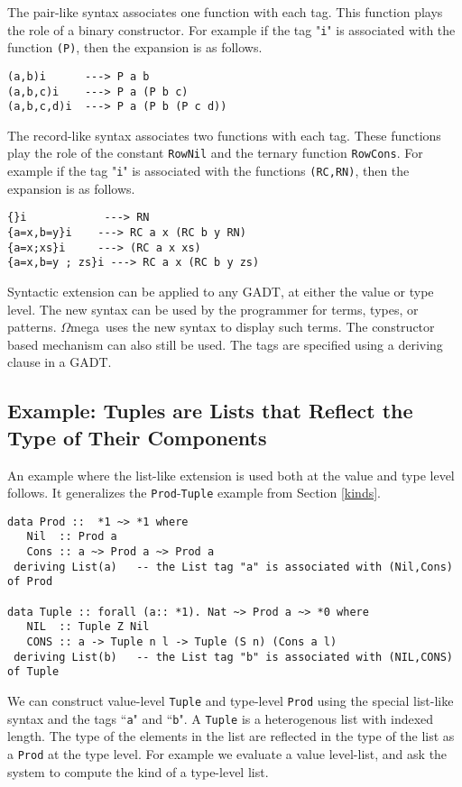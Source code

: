 \documentclass[11pt,twoside]{article}
\newcommand{\om}{$\Omega$mega}
\begin{document}
The pair-like syntax associates one function with each
tag. This function plays the role of a binary constructor.
For example if the tag "{\tt i}" is associated with
the function {\tt (P)}, then the expansion is as follows.
\begin{verbatim}
(a,b)i      ---> P a b
(a,b,c)i    ---> P a (P b c)
(a,b,c,d)i  ---> P a (P b (P c d))
\end{verbatim}

The record-like syntax associates two functions with each
tag. These functions play the role of the constant {\tt RowNil} and 
the ternary function {\tt RowCons}.
For example if the tag "{\tt i}" is associated with
the functions {\tt (RC,RN)}, then the expansion is as follows.
\begin{verbatim}
{}i            ---> RN
{a=x,b=y}i    ---> RC a x (RC b y RN)
{a=x;xs}i     ---> (RC a x xs)
{a=x,b=y ; zs}i ---> RC a x (RC b y zs)
\end{verbatim}

Syntactic extension can be applied to any GADT, at either the value or type level. The
new syntax can be used by the programmer for terms, types, or patterns. \om\ uses the
new syntax to display such terms. The constructor based mechanism can also still
be used. The tags are specified using a deriving clause in a GADT. 

\subsection{Example: Tuples are Lists that Reflect the Type of Their Components}

An example where the
list-like extension is used both at the value and type level follows.
It generalizes the {\tt Prod}-{\tt Tuple} example from Section \ref{kinds}.



\begin{verbatim}
data Prod ::  *1 ~> *1 where
   Nil  :: Prod a
   Cons :: a ~> Prod a ~> Prod a
 deriving List(a)   -- the List tag "a" is associated with (Nil,Cons) of Prod

data Tuple :: forall (a:: *1). Nat ~> Prod a ~> *0 where
   NIL  :: Tuple Z Nil
   CONS :: a -> Tuple n l -> Tuple (S n) (Cons a l)
 deriving List(b)   -- the List tag "b" is associated with (NIL,CONS) of Tuple
\end{verbatim} 
We can construct value-level {\tt Tuple} and type-level {\tt Prod} using
the special list-like syntax and the tags ``{\tt a}" and ``{\tt b}". A {\tt Tuple}
is a heterogenous list with indexed length. The type of the elements in
the list are reflected in the type of the list as a {\tt Prod} at the type
level. For example we evaluate a value level-list, and ask the system
to compute the kind of a type-level list.
\end{document}
